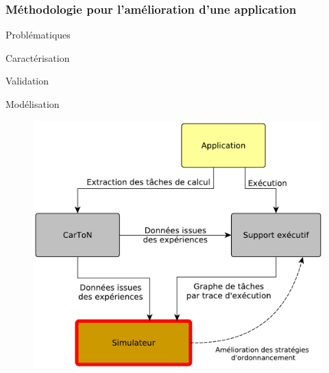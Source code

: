 \documentclass[xcolor={usenames,dvipsnames,svgnames,table}, aspectratio=43]{beamer}
\begin{document}
\begin{frame}
  \frametitle{Méthodologie pour l'amélioration d'une application}
  \begin{minipage}[t]{0.36\linewidth}
    \begin{block}{Problématiques}
      \begin{itemize}
	{
	  \item Caractérisation
	  \item Validation
	}
	\item Modélisation
      \end{itemize}
    \end{block}
  \end{minipage}
      \hfill
  \begin{minipage}[t]{0.60\linewidth}
    \begin{figure}
      \includegraphics[width=\textwidth]{graph/big_picture-part3.pdf}%
    \end{figure}
  \end{minipage}
\end{frame}
\end{document}
